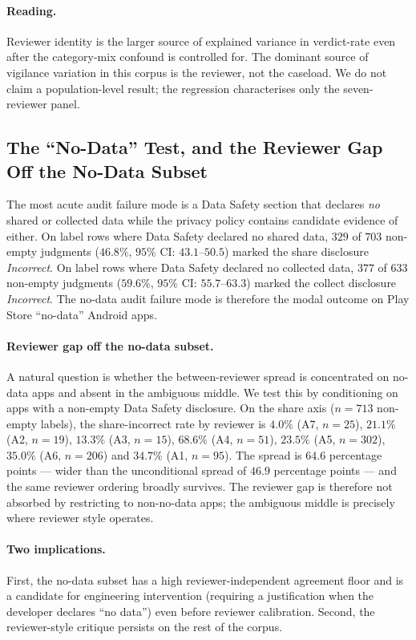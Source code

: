 \documentclass[11pt,a4paper]{article}
\newcommand{\Acc}[1]{\textsf{A#1}}
\begin{document}
\paragraph{Reading.}
Reviewer identity is the larger source of explained variance in
verdict-rate even after the category-mix confound is controlled
for. The dominant source of vigilance variation in this corpus is
the reviewer, not the caseload. We do not claim a population-level
result; the regression characterises only the seven-reviewer panel.

\subsection{The ``No-Data'' Test, and the Reviewer Gap Off the No-Data Subset}
\label{sec:nodata}

The most acute audit failure mode is a Data Safety section that
declares \emph{no} shared or collected data while the privacy policy
contains candidate evidence of either. On label rows where Data
Safety declared no shared data, $329$ of $703$ non-empty judgments
($46.8\%$, $95\%$ CI: $43.1$--$50.5$) marked the share disclosure
\emph{Incorrect}. On label rows where Data Safety declared no
collected data, $377$ of $633$ non-empty judgments
($59.6\%$, $95\%$ CI: $55.7$--$63.3$) marked the collect disclosure
\emph{Incorrect}. The no-data audit failure mode is therefore the
modal outcome on Play Store ``no-data'' Android apps.

\paragraph{Reviewer gap off the no-data subset.}
A natural question is whether the between-reviewer spread is
concentrated on no-data apps and absent in the ambiguous middle.
We test this by conditioning on apps with a non-empty Data Safety
disclosure. On the share axis ($n=713$ non-empty labels), the
share-incorrect rate by reviewer is $4.0\%$ (\Acc{7}, $n=25$),
$21.1\%$ (\Acc{2}, $n=19$), $13.3\%$ (\Acc{3}, $n=15$),
$68.6\%$ (\Acc{4}, $n=51$), $23.5\%$ (\Acc{5}, $n=302$),
$35.0\%$ (\Acc{6}, $n=206$) and $34.7\%$ (\Acc{1}, $n=95$). The
spread is $64.6$ percentage points --- wider than the unconditional
spread of $46.9$ percentage points --- and the same reviewer ordering
broadly survives. The reviewer gap is therefore not absorbed by
restricting to non-no-data apps; the ambiguous middle is precisely
where reviewer style operates.

\paragraph{Two implications.}
First, the no-data subset has a high reviewer-independent agreement
floor and is a candidate for engineering intervention (requiring a
justification when the developer declares ``no data'') even before
reviewer calibration. Second, the reviewer-style critique persists
on the rest of the corpus.
\end{document}
